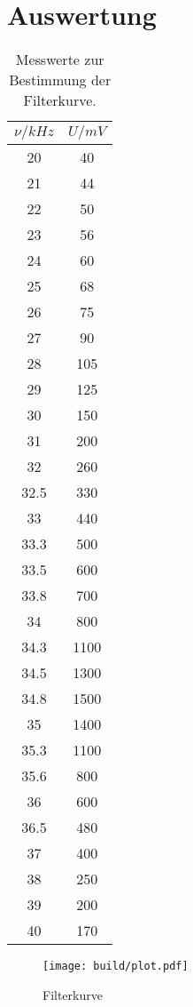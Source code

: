 \section{Auswertung}
\label{sec:Auswertung}


\begin{table}[H]
    \centering
    \caption{Messwerte zur Bestimmung der Filterkurve.}
    \label{tab:filter}
    \begin{tabular}{c c}
        \toprule
        $\nu /kHz$ & $U / mV$ \\
        \midrule
        20    &  40   \\
        21    &  44   \\
        22    &  50   \\
        23    &  56   \\
        24    &  60   \\
        25    &  68   \\
        26    &  75   \\
        27    &  90   \\
        28    &  105  \\
        29    &  125  \\
        30    &  150  \\
        31    &  200  \\
        32    &  260  \\
        32.5  &  330  \\    
        33    &  440  \\
        33.3  &  500  \\ 
        33.5  &  600  \\
        33.8  &  700  \\
        34    &  800  \\
        34.3  &  1100  \\
        34.5  &  1300 \\
        34.8  &  1500 \\
        35    &  1400 \\
        35.3  &  1100 \\
        35.6  &  800 \\ 
        36    &  600 \\
        36.5  &  480 \\ 
        37    &  400 \\
        38    &  250 \\
        39    &  200 \\
        40    &  170 \\
        \bottomrule
    \end{tabular}
\end{table}



\begin{figure}[H]
    \centering
    \texttt{[image: build/plot.pdf]}
    \caption{Filterkurve}
    \label{fig:filter}
\end{figure} 


